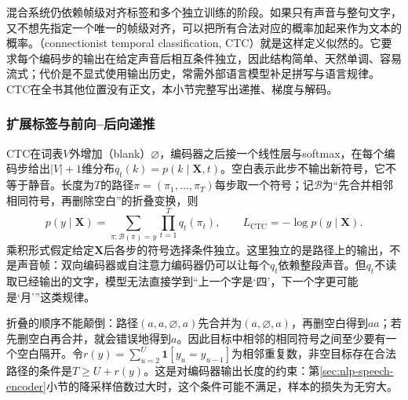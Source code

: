 混合系统仍依赖帧级对齐标签和多个独立训练的阶段。如果只有声音与整句文字，又不想先指定一个唯一的帧级对齐，可以把所有合法对应的概率加起来作为文本的概率。（connectionist temporal classification, CTC）就是这样定义似然的。它要求每个编码步的输出在给定声音后相互条件独立，因此结构简单、天然单调、容易流式；代价是不显式使用输出历史，常需外部语言模型补足拼写与语言规律。CTC在全书其他位置没有正文，本小节完整写出递推、梯度与解码。

\subsubsection{扩展标签与前向--后向递推}
\label{sec:nlp-speech-ctc-forward-backward}

CTC在词表$V$外增加（blank）$\varnothing$，编码器之后接一个线性层与softmax，在每个编码步给出$|V|+1$维分布$q_t(k)=p(k\mid\bm{X},t)$。空白表示此步不输出新符号，它不等于静音。长度为$T$的路径$\pi=(\pi_1,\ldots,\pi_T)$每步取一个符号；记$\mathcal{B}$为“先合并相邻相同符号，再删除空白”的折叠变换，则
\begin{equation}
 p(y\mid\bm{X})=
 \sum_{\pi:\mathcal{B}(\pi)=y}\prod_{t=1}^{T}q_t(\pi_t),
 \qquad L_{\mathrm{CTC}}=-\log p(y\mid\bm{X}).
 \label{eq:nlp-speech-ctc-probability}
\end{equation}
乘积形式假定给定$\bm{X}$后各步的符号选择条件独立。这里独立的是路径上的输出，不是声音帧：双向编码器或自注意力编码器仍可以让每个$q_t$依赖整段声音。但$q_t$不读取已经输出的文字，模型无法直接学到“上一个字是‘四’，下一个字更可能是‘月’”这类规律。

折叠的顺序不能颠倒：路径$(a,a,\varnothing,a)$先合并为$(a,\varnothing,a)$，再删空白得到$aa$；若先删空白再合并，就会错误地得到$a$。因此目标中相邻的相同符号之间至少要有一个空白隔开。令$r(y)=\sum_{u=2}^{U}\mathbf{1}[y_u=y_{u-1}]$为相邻重复数，非空目标存在合法路径的条件是$T\geq U+r(y)$。这是对编码器输出长度的约束：第\ref{sec:nlp-speech-encoder}小节的降采样倍数过大时，这个条件可能不满足，样本的损失为无穷大。

